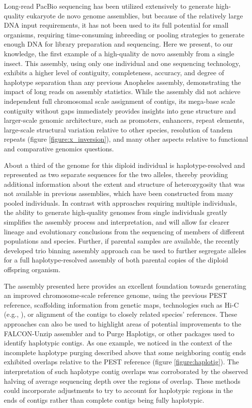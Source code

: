 {\par{
Long-read PacBio sequencing has been utilized extensively to generate high-quality eukaryote de novo genome assemblies, but because of the relatively large DNA input requirements, it has not been used to its full potential for small organisms, requiring time-consuming inbreeding or pooling strategies to generate enough DNA for library preparation and sequencing. Here we present, to our knowledge, the first example of a high-quality de novo assembly from a single insect. This assembly, using only one individual and one sequencing technology, exhibits a higher level of contiguity, completeness, accuracy, and degree of haplotype separation than any previous Anopheles assembly, demonstrating the impact of long reads on assembly statistics. While the assembly did not achieve independent full chromosomal scale assignment of contigs, its mega-base scale contiguity without gaps immediately provides insights into gene structure and larger-scale genomic architecture, such as promoters, enhancers, repeat elements, large-scale structural variation relative to other species, resolution of tandem repeats (figure \ref{figure:x_inversion}), and many other aspects relative to functional and comparative genomics questions.
}
\par{
About a third of the genome for this diploid individual is haplotype-resolved and represented as two separate sequences for the two alleles, thereby providing additional information about the extent and structure of heterozygosity that was not available in previous assemblies, which have been constructed from many pooled individuals. In contrast with approaches requiring multiple individuals, the ability to generate high-quality genomes from single individuals greatly simplifies the assembly process and interpretation, and will allow far clearer lineage and evolutionary conclusions from the sequencing of members of different populations and species. Further, if parental samples are available, the recently developed trio binning assembly approach \cite{triobinning} can be used to further segregate alleles for a full haplotype-resolved assembly of both parental copies of the diploid offspring organism.
}
\par{
The assembly presented here provides an excellent foundation towards generating an improved chromosome-scale reference genome, using the previous PEST reference, scaffolding information from genetic maps, technologies such as Hi-C (e.g., \cite{falconphase}), or alignment of the contigs to closely related species' references. These approaches can also be used to highlight areas of potential improvements to the FALCON-Unzip assembler and to Purge Haplotigs, or other packages used to identify haplotypic contigs. As one example, we noticed in the context of the incomplete haplotype purging described above that some neighboring contig ends exhibited overlaps relative to the PEST reference (figure \ref{figure:haplotig}). The interpretation of such haplotype contig overlaps was corroborated by the observed halving of average sequencing depth over the regions of overlap. These methods could incorporate adjustments to try to account for haplotypic regions in the ends of contigs rather than complete contigs being fully haplotypic.
}

}
